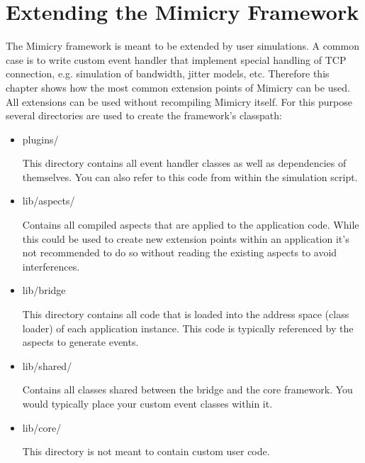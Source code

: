 \documentclass[a4paper,oneside]{book}
\begin{document}
\chapter{Extending the Mimicry Framework}
The Mimicry framework is meant to be extended by user simulations. A common case is to write custom event handler that implement special handling of TCP connection, e.g. simulation of bandwidth, jitter models, etc. Therefore this chapter shows how the most common extension points of Mimicry can be used. All extensions can be used without recompiling Mimicry itself. For this purpose several directories are used to create the framework's classpath:
\begin{itemize}
\item plugins/

This directory contains all event handler classes as well as dependencies of themselves. You can also refer to this code from within the simulation script.
\item lib/aspects/

Contains all compiled aspects that are applied to the application code. While this could be used to create new extension points within an application it's not recommended to do so without reading the existing aspects to avoid interferences.
\item lib/bridge

This directory contains all code that is loaded into the address space (class loader) of each application instance. This code is typically referenced by the aspects to generate events.
\item lib/shared/

Contains all classes shared between the bridge and the core framework. You would typically place your custom event classes within it.
\item lib/core/

This directory is not meant to contain custom user code.
\end{itemize}
\end{document}
